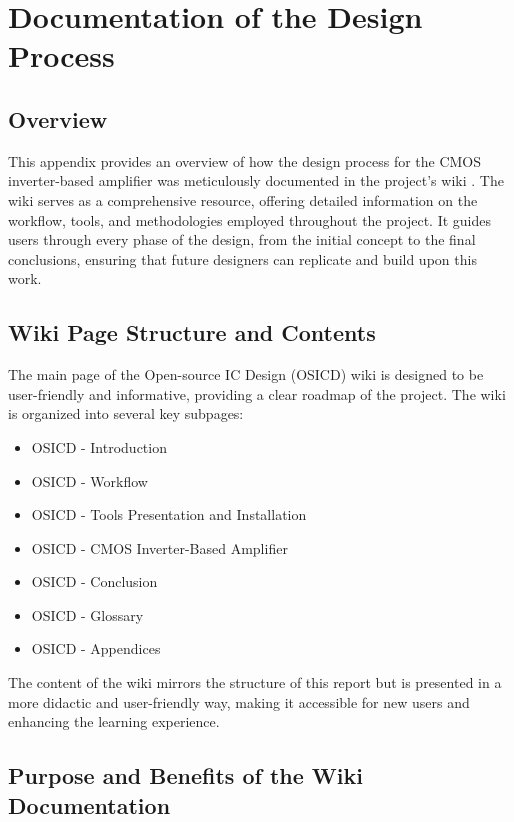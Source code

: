 \chapter{Documentation of the Design Process}
\label{AppendixB}

\section{Overview}

This appendix provides an overview of how the design process for the CMOS inverter-based amplifier was meticulously documented in the project's wiki \cite{ethz_bsse_wiki}. 
The wiki serves as a comprehensive resource, offering detailed information on the workflow, tools, and methodologies employed throughout the project. 
It guides users through every phase of the design, from the initial concept to the final conclusions, ensuring that future designers can replicate and build upon this work.


\section{Wiki Page Structure and Contents}

The main page of the Open-source IC Design (OSICD) wiki is designed to be user-friendly and informative, providing a clear roadmap of the project.
The wiki is organized into several key subpages:

\begin{itemize}
    \item OSICD - Introduction
    \item OSICD - Workflow
    \item OSICD - Tools Presentation and Installation
    \item OSICD - CMOS Inverter-Based Amplifier
    \item OSICD - Conclusion
    \item OSICD - Glossary
    \item OSICD - Appendices
\end{itemize}

The content of the wiki mirrors the structure of this report but is presented in a more didactic and user-friendly way, making it accessible for new users and enhancing the learning experience.

\section{Purpose and Benefits of the Wiki Documentation}


